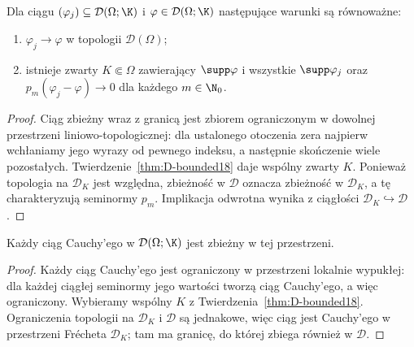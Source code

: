\begin{twierdzenie}
\label{thm:D-sequences18}
Dla ciągu $(\varphi_j)\subseteq\mathcal D(\Omega;\K)$
i $\varphi\in\mathcal D(\Omega;\K)$ następujące warunki
są równoważne:
\begin{enumerate}
\item $\varphi_j\to\varphi$ w topologii $\mathcal D(\Omega)$;
\item istnieje zwarty $K\Subset\Omega$ zawierający
$\supp\varphi$ i wszystkie $\supp\varphi_j$ oraz
$p_m(\varphi_j-\varphi)\to0$ dla każdego $m\in\N_0$.
\end{enumerate}
\end{twierdzenie}
\begin{proof}
Ciąg zbieżny wraz z granicą jest zbiorem ograniczonym
w dowolnej przestrzeni liniowo-topologicznej: dla ustalonego
otoczenia zera najpierw wchłaniamy jego wyrazy od pewnego
indeksu, a następnie skończenie wiele pozostałych.
Twierdzenie~\ref{thm:D-bounded18} daje wspólny zwarty $K$.
Ponieważ topologia na $\mathcal D_K$ jest względna,
zbieżność w $\mathcal D$ oznacza zbieżność w $\mathcal D_K$,
a tę charakteryzują seminormy $p_m$.
Implikacja odwrotna wynika z ciągłości
$\mathcal D_K\hookrightarrow\mathcal D$.
\end{proof}

\begin{wniosek}
\label{cor:D-seqcomplete18}
Każdy ciąg Cauchy'ego w $\mathcal D(\Omega;\K)$ jest
zbieżny w tej przestrzeni.
\end{wniosek}
\begin{proof}
Każdy ciąg Cauchy'ego jest ograniczony w przestrzeni lokalnie
wypukłej: dla każdej ciągłej seminormy jego wartości tworzą
ciąg Cauchy'ego, a więc ograniczony.
Wybieramy wspólny $K$ z
Twierdzenia~\ref{thm:D-bounded18}. Ograniczenia topologii
na $\mathcal D_K$ i $\mathcal D$ są jednakowe, więc ciąg
jest Cauchy'ego w przestrzeni Fr\'echeta $\mathcal D_K$;
tam ma granicę, do której zbiega również w $\mathcal D$.
\end{proof}

